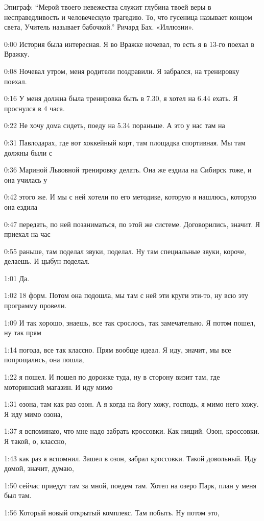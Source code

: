 

Эпиграф: ``Мерой твоего невежества служит глубина твоей веры в несправедливость и человеческую трагедию. То, что гусеница называет концом света, Учитель называет бабочкой.'' Ричард Бах. «Иллюзии».

0:00
История была интересная. Я во Вражке ночевал, то есть я в 13-го поехал в Вражку.

0:08
Ночевал утром, меня родители поздравили. Я забрался, на тренировку поехал.

0:16
У меня должна была тренировка быть в 7.30, я хотел на 6.44 ехать. Я проснулся в 4 часа.

0:22
Не хочу дома сидеть, поеду на 5.34 пораньше. А это у нас там на

0:31
Павлодарах, где вот хоккейный корт, там площадка спортивная. Мы там должны были с

0:36
Мариной Львовной тренировку делать. Она же ездила на Сибирск тоже, и она училась у

0:42
этого же. И мы с ней хотели по его методике, которую я нашлюсь, которую она ездила

0:47
передать, по ней позаниматься, по этой же системе. Договорились, значит. Я приехал на час

0:55
раньше, там поделал звуки, поделал. Ну там специальные звуки, короче, делаешь. И цыбун поделал.

1:01
Да.

1:02
18 форм. Потом она подошла, мы там с ней эти круги эти-то, ну всю эту программу провели.

1:09
И так хорошо, знаешь, все так срослось, так замечательно. Я потом пошел, ну так прям

1:14
погода, все так классно. Прям вообще идеал. Я иду, значит, мы все попрощались, она пошла,

1:22
я пошел. И пошел по дорожке туда, ну в сторону визит там, где моторинский магазин. И иду мимо

1:31
озона, там как раз озон. А я когда на йогу хожу, господь, я мимо него хожу. Я иду мимо озона,

1:37
я вспоминаю, что мне надо забрать кроссовки. Как нищий. Озон, кроссовки. Я такой, о, классно,

1:43
как раз я вспомнил. Зашел в озон, забрал кроссовки. Такой довольный. Иду домой, значит, думаю,

1:50
сейчас приедут там за мной, поедем там. Хотел на озеро Парк, план у меня был там.

1:56
Который новый открытый комплекс. Там побыть. Ну потом это,

